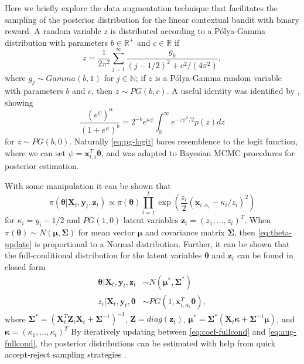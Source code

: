 \documentclass[12pt]{article}
\begin{document}
Here we briefly explore the data augmentation technique that facilitates the 
sampling of the posterior distribution for the linear contextual bandit with
binary reward.
A random variable $z$ is distributed according to a P\'olya-Gamma distribution
with parameters $b \in \mathbb{R}^{+}$ and $c \in \mathbb{R}$ if 
\begin{equation}
z = \frac{1}{2\pi^2} \sum_{j = 1}^\infty \frac{g_k}{(j - 1/2)^2 + c^2/(4\pi^2)},
\end{equation}
where 
$g_j \sim Gamma(b,1)$ 
for $j \in \mathbb{N}$; if $z$ is a P\'olya-Gamma random variable with parameters
$b$ and $c$, then $z \sim PG(b,c)$. 
A useful identity was identified by \cite{polson2013bayesian}, showing
\begin{equation}
\frac{(e^\psi)^\alpha}{(1 + e^\psi)^b}
= 2^{-b}e^{\kappa\psi}
\int_0^\infty e^{-z\psi^2 / 2} p(z) dz
\label{eq:pg-logit}
\end{equation}
for $z \sim PG(b,0)$.
Naturally \eqref{eq:pg-logit} bares resemblence to the logit function, where we
can set $\psi = \bm{x}_{t,i}^T\bm{\theta}$, and was adapted to Bayesian MCMC 
procedures for posterior estimation.

With some manipulation it can be shown that
\begin{equation}
\pi(\bm{\theta} \vert \bm{X}_t, \bm{y}_t, \bm{z}_t)
\propto \pi(\bm{\theta})
\prod_{i = 1}^t \exp(\frac{z_i}{2} (\bm{x}_{i,\alpha_i} - \kappa_i/z_i)^2)
\label{eq:theta-update}
\end{equation}
for $\kappa_i = y_i - 1/2$ and $PG(1,0)$ latent variables 
$\bm{z}_t = (z_1, \ldots, z_t)^T$. 
When $\pi(\bm{\theta}) \sim N(\bm{\mu}, \bm{\Sigma})$ 
for mean vector $\bm{\mu}$ and covariance matrix $\bm{\Sigma}$, then
\eqref{eq:theta-update} is proportional to a Normal distribution.
Further, it can be shown that the full-conditional distribution for the latent
variables $\bm{\theta}$ and $\bm{z}_t$ can be found in closed form
\begin{align}
\bm{\theta} \vert \bm{X}_t, \bm{y}_t, \bm{z}_t & 
\sim N(\bm{\mu}^*, \bm{\Sigma}^*) \label{eq:coef-fullcond}\\
z_i \vert \bm{X}_t, \bm{y}_t, \bm{\theta} & 
\sim PG(1, \bm{x}_{i,\alpha_i}^T \bm{\theta}) \label{eq:aug-fullcond},
\end{align}
where 
$\bm{\Sigma}^* = (\bm{X}_t^T \bm{Z}_t \bm{X}_t + \bm{\Sigma}^{-1})^{-1}$,
$\bm{Z} = diag(\bm{z}_t)$,
$\bm{\mu}^* = \bm{\Sigma}^*(\bm{X}_t \bm{\kappa} + \bm{\Sigma}^{-1}\bm{\mu})$,
and 
$\bm{\kappa} = (\kappa_1, \ldots, \kappa_t)^T$
By iteratively updating between \eqref{eq:coef-fullcond} and 
\eqref{eq:aug-fullcond}, the posterior distributions can be estimated with 
help from quick accept-reject sampling strategies \cite{makalicpkg}.
\end{document}
